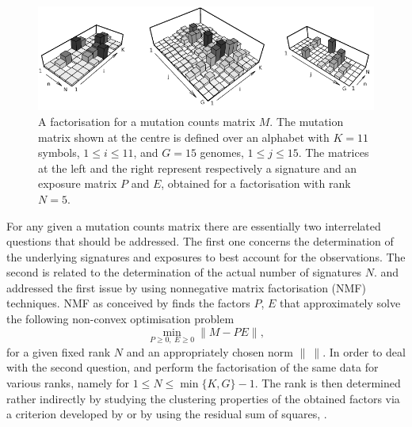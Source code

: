 \documentclass{bioinfo}
\begin{document}
\begin{figure}
 \centering\includegraphics[width=13.5cm]{figs/f_bw_t}
 \caption{\textrm{%
  A factorisation for a mutation counts matrix $M$. The
  mutation matrix shown at the centre is defined over an alphabet with
  $K=11$ symbols, $1 \leqslant i \leqslant 11$, and $G=15$ genomes,
  $1\leqslant j\leqslant 15$. The matrices at the left and the right 
  represent respectively a signature and an exposure matrix $P$ and
  $E$, obtained for a factorisation with rank $N=5$.
  }
 }
\label{fig:toyNMF}
\end{figure}


For any given a mutation counts matrix there are essentially two
interrelated questions that should be addressed. The first one
concerns the determination of the underlying signatures and exposures
to best account for the observations. The second is related to the
determination of the actual number of signatures $N$. \cite{NCell} and
\cite{A} addressed the first issue by using nonnegative matrix
factorisation (NMF) techniques.  NMF as conceived by \cite{LS} finds
the factors $P$, $E$ that approximately solve the following non-convex
optimisation problem
\begin{equation}
  \label{eqn:NMF}
    \min_{P\geqslant 0,\ E\geqslant 0}\|M - PE\|,
\end{equation}
for a given fixed rank $N$ and an appropriately chosen norm $\|\ \|$.
In order to deal with the second question, \cite{NCell} and \cite{A}
perform the factorisation of the same data for various ranks, namely
for $1 \leq N \leq \min\{K, G\}-1$. The rank is then determined rather 
indirectly by studying the clustering properties of the obtained
factors via a criterion developed by \cite{BTGM} or by using the
residual sum of squares, \cite{HMSG}.
\end{document}
